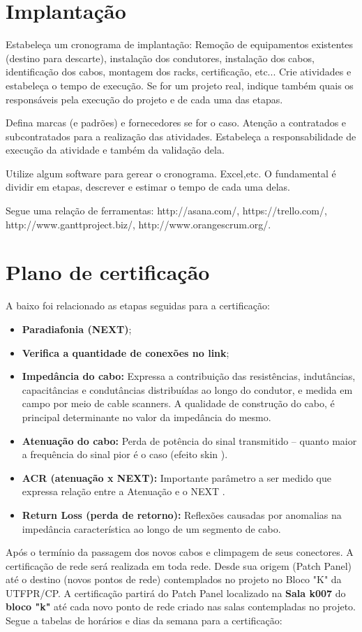 \documentclass[	DIV=calc,%
							paper=a4,%
							fontsize=12pt,%
							onecolumn]{scrartcl}	 					%
\begin{document}
\section{Implantação}
Estabeleça um cronograma de implantação:
Remoção de equipamentos existentes (destino para descarte), instalação dos condutores, instalação dos cabos, 
identificação dos cabos, montagem dos racks, certificação, etc... Crie atividades e estabeleça o tempo de execução. Se for um projeto real, indique também quais os responsáveis pela execução do projeto e de cada uma das etapas.

Defina marcas (e padrões) e fornecedores se for o caso. Atenção a contratados e subcontratados para a realização das atividades. Estabeleça a responsabilidade de execução da atividade e também da validação dela.

Utilize algum software para gerear o cronograma. Excel,etc. O fundamental é dividir em etapas, descrever e estimar o tempo de cada uma delas.

Segue uma relação de ferramentas:
http://asana.com/, 
https://trello.com/, 
http://www.ganttproject.biz/, 
http://www.orangescrum.org/. 

\section{Plano de certificação}
A baixo foi relacionado as etapas seguidas para a certificação:
\begin{itemize}
\item \textbf{Paradiafonia (NEXT)};
\item \textbf{Verifica a quantidade de conexões no link};
\item \textbf{Impedância do cabo:} Expressa a contribuição das resistências, indutâncias, capacitâncias e condutâncias distribuídas ao longo do condutor, e medida em campo por meio de cable scanners. A qualidade de construção do cabo, é principal determinante no valor da impedância do mesmo.
\item \textbf{Atenuação do cabo:} Perda de potência do sinal transmitido – quanto maior a frequência do sinal pior é o caso (efeito skin ).
\item \textbf{ACR (atenuação x NEXT):} Importante parâmetro a ser medido que expressa relação entre a Atenuação e o NEXT .
\item \textbf{Return Loss (perda de retorno):} Reflexões causadas por anomalias na impedância característica ao longo de um segmento de cabo.
\end{itemize}
Após o termínio da passagem dos novos cabos e climpagem de seus conectores. A certificação de rede será realizada em toda rede. Desde sua origem (Patch Panel) até o destino (novos pontos de rede) contemplados no projeto no Bloco "K" da UTFPR/CP. 
A certificação partirá do Patch Panel localizado na \textbf{Sala k007} do \textbf{bloco "k"} até cada novo ponto de rede criado nas salas contempladas no projeto. 
Segue a tabelas de horários e dias da semana para a certificação:
\end{document}
